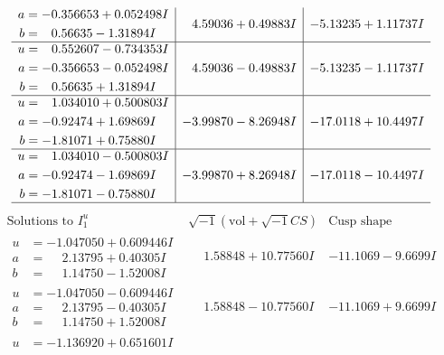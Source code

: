 \documentclass[1p]{elsarticle_modified}
\theoremstyle{definition}
\newcommand{\I}{\sqrt{-1}}
\begin{document}
$$\begin{array}{c|c|c}
\begin{aligned}
a &= -0.356653 + 0.052498 I \\
b &= \phantom{-}0.56635 - 1.31894 I\end{aligned}
 & \phantom{-}4.59036 + 0.49883 I & -5.13235 + 1.11737 I \\ \hline\begin{aligned}
u &= \phantom{-}0.552607 - 0.734353 I \\
a &= -0.356653 - 0.052498 I \\
b &= \phantom{-}0.56635 + 1.31894 I\end{aligned}
 & \phantom{-}4.59036 - 0.49883 I & -5.13235 - 1.11737 I \\ \hline\begin{aligned}
u &= \phantom{-}1.034010 + 0.500803 I \\
a &= -0.92474 + 1.69869 I \\
b &= -1.81071 + 0.75880 I\end{aligned}
 & -3.99870 - 8.26948 I & -17.0118 + 10.4497 I \\ \hline\begin{aligned}
u &= \phantom{-}1.034010 - 0.500803 I \\
a &= -0.92474 - 1.69869 I \\
b &= -1.81071 - 0.75880 I\end{aligned}
 & -3.99870 + 8.26948 I & -17.0118 - 10.4497 I\\
 \hline 
 \end{array}$$\newpage$$\begin{array}{c|c|c}  
\text{Solutions to }I^u_{1}& \I (\text{vol} + \sqrt{-1}CS) & \text{Cusp shape}\\
 \hline 
\begin{aligned}
u &= -1.047050 + 0.609446 I \\
a &= \phantom{-}2.13795 + 0.40305 I \\
b &= \phantom{-}1.14750 - 1.52008 I\end{aligned}
 & \phantom{-}1.58848 + 10.77560 I & -11.1069 - 9.6699 I \\ \hline\begin{aligned}
u &= -1.047050 - 0.609446 I \\
a &= \phantom{-}2.13795 - 0.40305 I \\
b &= \phantom{-}1.14750 + 1.52008 I\end{aligned}
 & \phantom{-}1.58848 - 10.77560 I & -11.1069 + 9.6699 I \\ \hline\begin{aligned}
u &= -1.136920 + 0.651601 I \\

\end{aligned}
\end{array}$$
\end{document}
